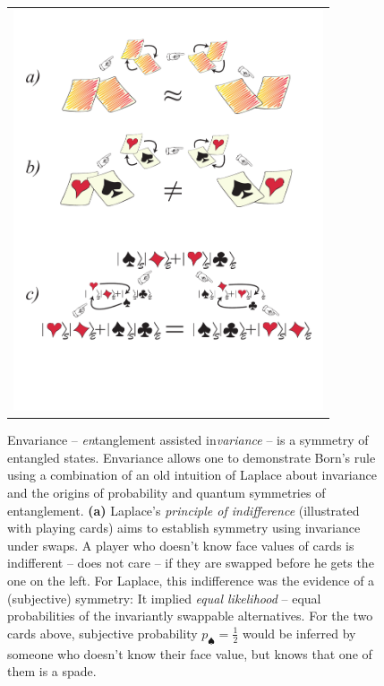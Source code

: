\documentclass[aps,amsmath,amssymb,amsfonts,floatfix]{revtex4-1}
\newcommand{\+}         {\dagger}
\begin{document}
{\begin{figure}[htb]
\begin{tabular}{l}
\vspace{-0.25in}
\includegraphics[width=3.6in]{allcards.pdf}\\
\end{tabular}
\caption{\footnotesize
Envariance -- {\it en}tanglement assisted in{\it variance} -- is a symmetry of entangled states. Envariance allows one to demonstrate Born's rule \cite{76,78,75} using a combination of an old intuition of Laplace \cite{40}
about invariance and the origins of probability and quantum symmetries of entanglement.
{\bf (a)} Laplace's {\it principle of indifference} (illustrated with playing cards) aims to establish
 symmetry using invariance under swaps.
A player who doesn't know face values of cards is  indifferent -- does not care -- if they are swapped before
he gets the one on the left. For Laplace, this indifference was the evidence of a (subjective) symmetry: 
It implied {\it equal likelihood} -- equal probabilities of the invariantly swappable
alternatives. For the two cards above, subjective probability $p_\spadesuit ={ \frac 1 2}$ would be inferred by someone who doesn't know their face value, but knows that one of them is a spade. 
}
\end{figure}}
\end{document}
